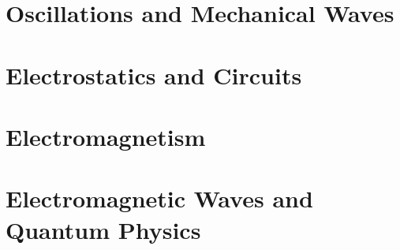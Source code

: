 \documentclass[dvipsnames]{article}
\begin{document}
\clearpage

\section{Oscillations and Mechanical Waves}

\clearpage

\section{Electrostatics and Circuits}

\clearpage

\section{Electromagnetism}

\clearpage

\section{Electromagnetic Waves and Quantum Physics}


\clearpage

{}
\printnoidxglossaries
\end{document}
